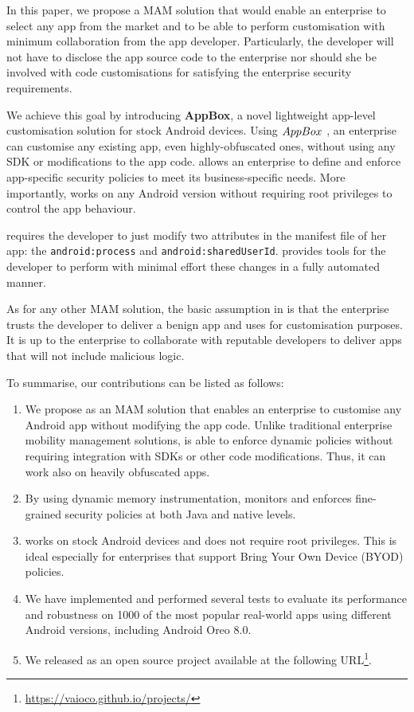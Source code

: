 In this paper, we propose a MAM solution that would enable an enterprise to select any app from the market and to be able to perform customisation with minimum collaboration from the app developer. 
Particularly, the developer will not have to disclose the app source code to the enterprise nor should she be involved with code customisations for satisfying the enterprise security requirements.

We achieve this goal by introducing \textbf{AppBox}, a novel lightweight app-level customisation solution for stock Android devices.
Using $AppBox~$, an enterprise can customise any existing app, even highly-obfuscated ones, without using any SDK or modifications to the app code.
\asd allows an enterprise to define and enforce app-specific security policies to meet its business-specific needs.
More importantly, \asd works on any Android version without requiring  root privileges to control the app behaviour.

\asd requires the developer to just modify two attributes in the manifest file of her app: the \texttt{android:process} and \texttt{android:sharedUserId}.
\asd provides tools for the developer to perform with minimal effort these changes in a fully automated manner.


As for any other MAM solution, the basic assumption in \asd is that the enterprise trusts the developer to deliver a benign app and uses \asd for customisation purposes.
It is up to the enterprise to collaborate with reputable developers to deliver apps that will not include malicious logic. 


To summarise, our contributions can be listed as follows: 

\begin{enumerate}
\item We propose \asd as an MAM solution that enables an enterprise to customise any Android app without modifying the app code. Unlike traditional enterprise mobility management solutions, \asd is able to enforce dynamic policies without requiring integration with SDKs or other code modifications. Thus, it can work also on heavily obfuscated apps.

\item By using dynamic memory instrumentation, \asd monitors and enforces fine-grained security policies at both Java and native levels.

\item \asd works on stock Android devices and does not require root privileges. This is ideal especially for enterprises that support Bring Your Own Device (BYOD) policies.  

\item We have implemented \asd and performed several tests to evaluate its performance and robustness on 1000 of the most popular real-world apps using  different Android versions, including Android Oreo 8.0. 

\item We released \asd as an open source project available at the following URL\footnote{ \url{https://vaioco.github.io/projects/}}.
\end{enumerate}